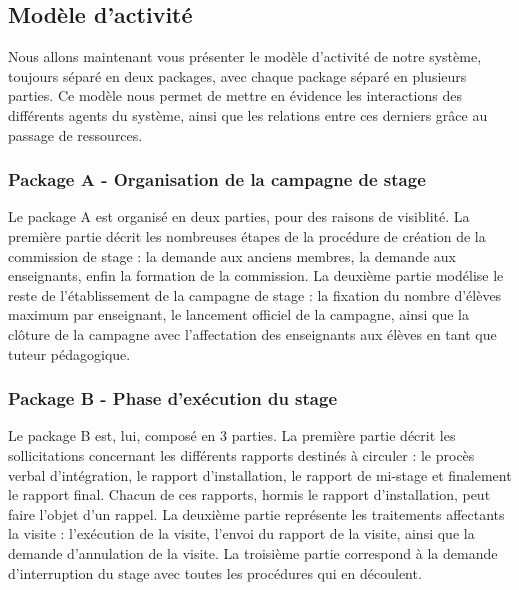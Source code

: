 \documentclass[12pt,a4paper]{article}
\begin{document}
\subsection{Modèle d'activité}

Nous allons maintenant vous présenter le modèle d'activité de notre système,
toujours séparé en deux packages, avec chaque package séparé en plusieurs
parties. Ce modèle nous permet de mettre en évidence les interactions des
différents agents du système, ainsi que les relations entre ces derniers grâce
au passage de ressources.

\subsubsection{Package A - Organisation de la campagne de stage}

Le package A est organisé en deux parties, pour des raisons de visiblité. La
première partie décrit les nombreuses étapes de la procédure de création de la
commission de stage : la demande aux anciens membres, la demande aux
enseignants, enfin la formation de la commission. La deuxième partie modélise le
reste de l'établissement de la campagne de stage : la fixation du nombre
d'élèves maximum par enseignant, le lancement officiel de la campagne, ainsi que
la clôture de la campagne avec l'affectation des enseignants aux élèves en tant
que tuteur pédagogique.

{
    \newpage {} 
    
    \restoregeometry {} \newpage
}

{
    \newpage {} 
    
    \restoregeometry {} \newpage
}

\subsubsection{Package B - Phase d'exécution du stage}

Le package B est, lui, composé en 3 parties. La première partie décrit les
sollicitations concernant les différents rapports destinés à circuler : le
procès verbal d'intégration, le rapport d'installation, le rapport de mi-stage et
finalement le rapport final. Chacun de ces rapports, hormis le rapport
d'installation, peut faire l'objet d'un rappel. La deuxième partie représente
les traitements affectants la visite : l'exécution de la visite, l'envoi du
rapport de la visite, ainsi que la demande d'annulation de la visite. La
troisième partie correspond à la demande d'interruption du stage avec toutes les
procédures qui en découlent.
\end{document}
